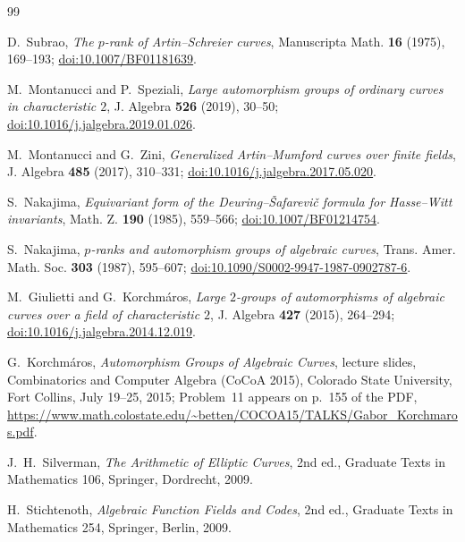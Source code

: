 \documentclass[11pt]{article}
\theoremstyle{remark}
\newcommand{\doi}[1]{\href{https://doi.org/#1}{doi:#1}}
\begin{document}
\begin{thebibliography}{99}

D.~Subrao,
\emph{The $p$-rank of Artin--Schreier curves},
Manuscripta Math. \textbf{16} (1975), 169--193;
\doi{10.1007/BF01181639}.

M.~Montanucci and P.~Speziali,
\emph{Large automorphism groups of ordinary curves in characteristic $2$},
J. Algebra \textbf{526} (2019), 30--50;
\doi{10.1016/j.jalgebra.2019.01.026}.

M.~Montanucci and G.~Zini,
\emph{Generalized Artin--Mumford curves over finite fields},
J. Algebra \textbf{485} (2017), 310--331;
\doi{10.1016/j.jalgebra.2017.05.020}.

S.~Nakajima,
\emph{Equivariant form of the Deuring--{\v S}afarevi{\v c} formula for Hasse--Witt invariants},
Math. Z. \textbf{190} (1985), 559--566;
\doi{10.1007/BF01214754}.

S.~Nakajima,
\emph{$p$-ranks and automorphism groups of algebraic curves},
Trans. Amer. Math. Soc. \textbf{303} (1987), 595--607;
\doi{10.1090/S0002-9947-1987-0902787-6}.

M.~Giulietti and G.~Korchm\'aros,
\emph{Large $2$-groups of automorphisms of algebraic curves over a field of characteristic $2$},
J. Algebra \textbf{427} (2015), 264--294;
\doi{10.1016/j.jalgebra.2014.12.019}.

G.~Korchm\'aros,
\emph{Automorphism Groups of Algebraic Curves},
lecture slides, Combinatorics and Computer Algebra (CoCoA 2015),
Colorado State University, Fort Collins, July 19--25, 2015;
Problem~11 appears on p.~155 of the PDF,
\url{https://www.math.colostate.edu/~betten/COCOA15/TALKS/Gabor_Korchmaros.pdf}.

J.~H.~Silverman,
\emph{The Arithmetic of Elliptic Curves},
2nd ed., Graduate Texts in Mathematics 106, Springer, Dordrecht, 2009.

H.~Stichtenoth,
\emph{Algebraic Function Fields and Codes},
2nd ed., Graduate Texts in Mathematics 254, Springer, Berlin, 2009.

\end{thebibliography}
\end{document}
